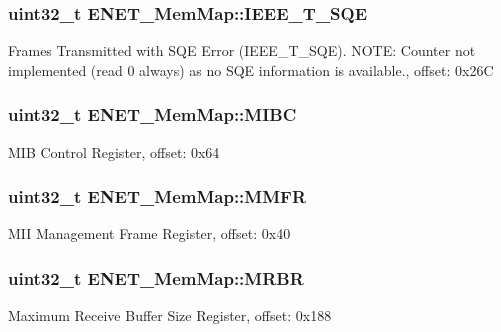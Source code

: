 \subsubsection[{I\+E\+E\+E\+\_\+\+T\+\_\+\+S\+Q\+E}]{\setlength{\rightskip}{0pt plus 5cm}uint32\+\_\+t E\+N\+E\+T\+\_\+\+Mem\+Map\+::\+I\+E\+E\+E\+\_\+\+T\+\_\+\+S\+Q\+E}\label{struct_e_n_e_t___mem_map_a13fe42ca63a29e999abba2172d85f399}
Frames Transmitted with S\+Q\+E Error (I\+E\+E\+E\+\_\+\+T\+\_\+\+S\+Q\+E). N\+O\+T\+E\+: Counter not implemented (read 0 always) as no S\+Q\+E information is available., offset\+: 0x26\+C \hypertarget{struct_e_n_e_t___mem_map_ab857a4b0f285d775c06ab7cf96d96f26}{}
\subsubsection[{M\+I\+B\+C}]{\setlength{\rightskip}{0pt plus 5cm}uint32\+\_\+t E\+N\+E\+T\+\_\+\+Mem\+Map\+::\+M\+I\+B\+C}\label{struct_e_n_e_t___mem_map_ab857a4b0f285d775c06ab7cf96d96f26}
M\+I\+B Control Register, offset\+: 0x64 \hypertarget{struct_e_n_e_t___mem_map_a588920cf00b8cf33e91b9a1fe5ce04ef}{}
\subsubsection[{M\+M\+F\+R}]{\setlength{\rightskip}{0pt plus 5cm}uint32\+\_\+t E\+N\+E\+T\+\_\+\+Mem\+Map\+::\+M\+M\+F\+R}\label{struct_e_n_e_t___mem_map_a588920cf00b8cf33e91b9a1fe5ce04ef}
M\+I\+I Management Frame Register, offset\+: 0x40 \hypertarget{struct_e_n_e_t___mem_map_ac439e5c3a7baf9471d1eb0b1722f4000}{}
\subsubsection[{M\+R\+B\+R}]{\setlength{\rightskip}{0pt plus 5cm}uint32\+\_\+t E\+N\+E\+T\+\_\+\+Mem\+Map\+::\+M\+R\+B\+R}\label{struct_e_n_e_t___mem_map_ac439e5c3a7baf9471d1eb0b1722f4000}
Maximum Receive Buffer Size Register, offset\+: 0x188 \hypertarget{struct_e_n_e_t___mem_map_a635a1d1269e342c592757d49b5073507}{}

